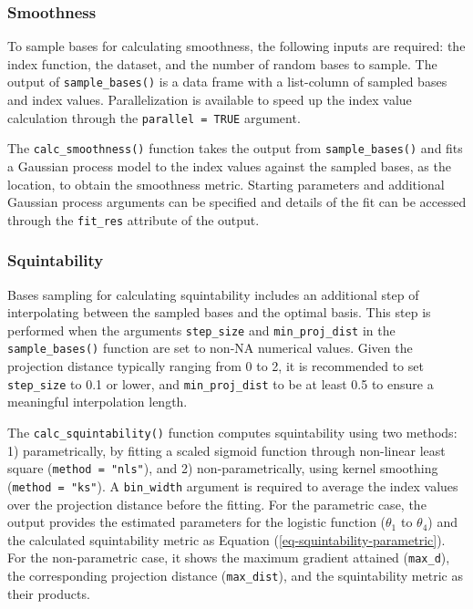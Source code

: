 \documentclass[
  12pt,
]{interact}
\theoremstyle{plain}
\begin{document}
\subsubsection{Smoothness}\label{smoothness}

To sample bases for calculating smoothness, the following inputs are
required: the index function, the dataset, and the number of random
bases to sample. The output of \texttt{sample\_bases()} is a data frame
with a list-column of sampled bases and index values. Parallelization is
available to speed up the index value calculation through the
\texttt{parallel\ =\ TRUE} argument.

The \texttt{calc\_smoothness()} function takes the output from
\texttt{sample\_bases()} and fits a Gaussian process model to the index
values against the sampled bases, as the location, to obtain the
smoothness metric. Starting parameters and additional Gaussian process
arguments can be specified and details of the fit can be accessed
through the \texttt{fit\_res} attribute of the output.

\subsubsection{Squintability}\label{squintability}

Bases sampling for calculating squintability includes an additional step
of interpolating between the sampled bases and the optimal basis. This
step is performed when the arguments \texttt{step\_size} and
\texttt{min\_proj\_dist} in the \texttt{sample\_bases()} function are
set to non-NA numerical values. Given the projection distance typically
ranging from 0 to 2, it is recommended to set \texttt{step\_size} to 0.1
or lower, and \texttt{min\_proj\_dist} to be at least 0.5 to ensure a
meaningful interpolation length.

The \texttt{calc\_squintability()} function computes squintability using
two methods: 1) parametrically, by fitting a scaled sigmoid function
through non-linear least square (\texttt{method\ =\ "nls"}), and 2)
non-parametrically, using kernel smoothing (\texttt{method\ =\ "ks"}). A
\texttt{bin\_width} argument is required to average the index values
over the projection distance before the fitting. For the parametric
case, the output provides the estimated parameters for the logistic
function (\(\theta_1\) to \(\theta_4\)) and the calculated squintability
metric as Equation (\ref{eq-squintability-parametric}). For the
non-parametric case, it shows the maximum gradient attained
(\texttt{max\_d}), the corresponding projection distance
(\texttt{max\_dist}), and the squintability metric as their products.
\end{document}
